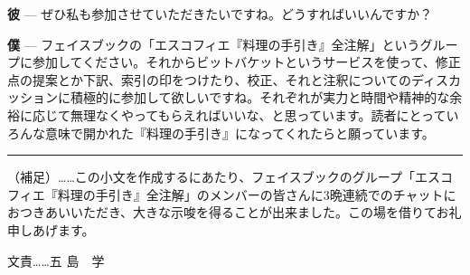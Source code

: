\documentclass[14Q,]{ltjsbook}
\renewcommand{\ldots}{\noindent…}
\renewcommand{\kenten}[1]{#1}
\begin{document}
\textbf{彼} ---
ぜひ私も参加させていただきたいですね。どうすればいいんですか？

\textbf{僕} ---
フェイスブックの「エスコフィエ『料理の手引き』全注解」というグループに参加してください。それからビットバケットというサービスを使って、修正点の提案とか下訳、索引の印をつけたり、校正、それと注釈についてのディスカッションに積極的に参加して欲しいですね。それぞれが実力と時間や精神的な余裕に応じて無理なくやってもらえればいいな、と思っています。読者にとっていろんな意味で\kenten{開かれた}『料理の手引き』になってくれたらと願っています。

\begin{center}\rule{0.5\linewidth}{\linethickness}\end{center}

（補足）\ldots{}\ldots{}この小文を作成するにあたり、フェイスブックのグループ「エスコフィエ『料理の手引き』全注解」のメンバーの皆さんに3晩連続でのチャットにおつきあいいただき、大きな示唆を得ることが出来ました。この場を借りてお礼申しあげます。

文責\ldots{}\ldots{}五 島　学

\backmatter



\renewcommand{\indexname}{総索引}
\printindex
\end{document}
